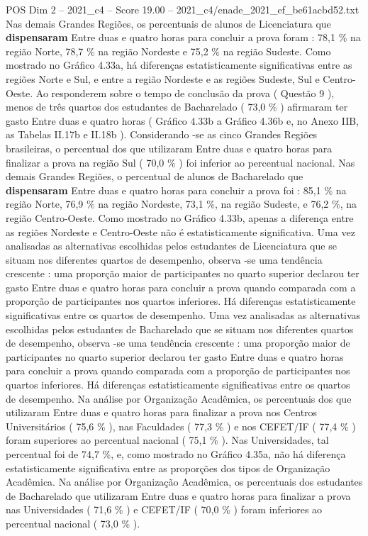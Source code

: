 \begin{textsample}{POS Dim 2 – 2021\_c4 – Score 19.00 – 2021\_c4/enade\_2021\_ef\_be61acbd52.txt}
Nas demais Grandes Regiões, os percentuais de alunos de Licenciatura que \textbf{dispensaram} Entre duas e quatro horas para concluir a prova foram : 78,1 \% na região Norte, 78,7 \% na região Nordeste e 75,2 \% na região Sudeste.
Como mostrado no Gráfico 4.33a, há diferenças estatisticamente significativas entre as regiões Norte e Sul, e entre a região Nordeste e as regiões Sudeste, Sul e Centro-Oeste.
Ao responderem sobre o tempo de conclusão da prova ( Questão 9 ), menos de três quartos dos estudantes de Bacharelado ( 73,0 \% ) afirmaram ter gasto Entre duas e quatro horas ( Gráfico 4.33b a Gráfico 4.36b e, no Anexo IIB, as Tabelas II.17b e II.18b ).
Considerando -se as cinco Grandes Regiões brasileiras, o percentual dos que utilizaram Entre duas e quatro horas para finalizar a prova na região Sul ( 70,0 \% ) foi inferior ao percentual nacional.
Nas demais Grandes Regiões, o percentual de alunos de Bacharelado que \textbf{dispensaram} Entre duas e quatro horas para concluir a prova foi : 85,1 \% na região Norte, 76,9 \% na região Nordeste, 73,1 \%, na região Sudeste, e 76,2 \%, na região Centro-Oeste.
Como mostrado no Gráfico 4.33b, apenas a diferença entre as regiões Nordeste e Centro-Oeste não é estatisticamente significativa.
Uma vez analisadas as alternativas escolhidas pelos estudantes de Licenciatura que se situam nos diferentes quartos de desempenho, observa -se uma tendência crescente : uma proporção maior de participantes no quarto superior declarou ter gasto Entre duas e quatro horas para concluir a prova quando comparada com a proporção de participantes nos quartos inferiores.
Há diferenças estatisticamente significativas entre os quartos de desempenho.
Uma vez analisadas as alternativas escolhidas pelos estudantes de Bacharelado que se situam nos diferentes quartos de desempenho, observa -se uma tendência crescente : uma proporção maior de participantes no quarto superior declarou ter gasto Entre duas e quatro horas para concluir a prova quando comparada com a proporção de participantes nos quartos inferiores.
Há diferenças estatisticamente significativas entre os quartos de desempenho.
Na análise por Organização Acadêmica, os percentuais dos que utilizaram Entre duas e quatro horas para finalizar a prova nos Centros Universitários ( 75,6 \% ), nas Faculdades ( 77,3 \% ) e nos CEFET/IF ( 77,4 \% ) foram superiores ao percentual nacional ( 75,1 \% ).
Nas Universidades, tal percentual foi de 74,7 \%, e, como mostrado no Gráfico 4.35a, não há diferença estatisticamente significativa entre as proporções dos tipos de Organização Acadêmica.
Na análise por Organização Acadêmica, os percentuais dos estudantes de Bacharelado que utilizaram Entre duas e quatro horas para finalizar a prova nas Universidades ( 71,6 \% ) e CEFET/IF ( 70,0 \% ) foram inferiores ao percentual nacional ( 73,0 \% ).

\end{textsample}
